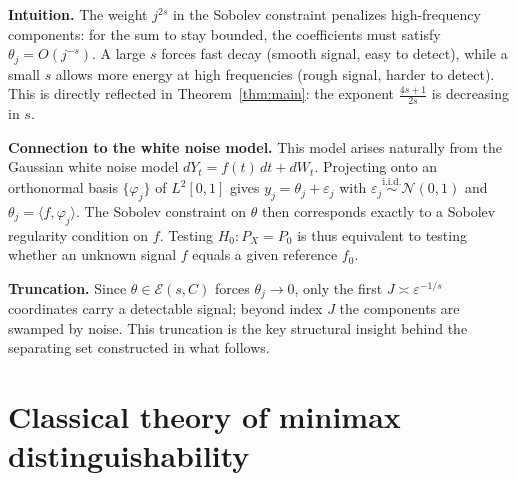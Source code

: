 \noindent\textbf{Intuition.} The weight $j^{2s}$ in the Sobolev constraint penalizes
high-frequency components: for the sum to stay bounded, the coefficients must satisfy
$\theta_j = O(j^{-s})$. A large $s$ forces fast decay (smooth signal, easy to detect),
while a small $s$ allows more energy at high frequencies (rough signal, harder to detect).
This is directly reflected in Theorem~\ref{thm:main}: the exponent $\frac{4s+1}{2s}$ is
decreasing in $s$.

\medskip\noindent\textbf{Connection to the white noise model.}
This model arises naturally from the Gaussian white noise model $dY_t = f(t)\,dt + dW_t$.
Projecting onto an orthonormal basis $\{\varphi_j\}$ of $L^2[0,1]$ gives
$y_j = \theta_j + \varepsilon_j$ with $\varepsilon_j \overset{\text{i.i.d.}}{\sim}
\mathcal{N}(0,1)$ and $\theta_j = \langle f, \varphi_j\rangle$. The Sobolev constraint on
$\theta$ then corresponds exactly to a Sobolev regularity condition on $f$. Testing $H_0 : P_X = P_0$ is thus equivalent to testing whether an unknown signal $f$
equals a given reference $f_0$.

\medskip\noindent\textbf{Truncation.} Since $\theta \in \mathcal{E}(s,C)$ forces
$\theta_j \to 0$, only the first $J \asymp \varepsilon^{-1/s}$ coordinates carry a detectable
signal; beyond index $J$ the components are swamped by noise. This truncation is the key
structural insight behind the separating set constructed in what follows.

\section{Classical theory of minimax distinguishability}
